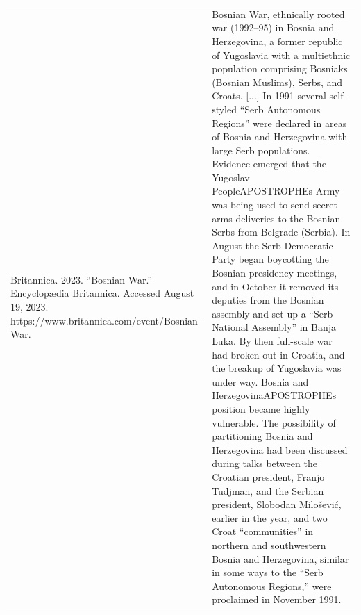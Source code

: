 {\begin{longtable}{p{}p{}}
Britannica. 2023. “Bosnian War.” Encyclopædia Britannica. Accessed August 19, 2023. https://www.britannica.com/event/Bosnian-War. & Bosnian War, ethnically rooted war (1992–95) in Bosnia and Herzegovina, a former republic of Yugoslavia with a multiethnic population comprising Bosniaks (Bosnian Muslims), Serbs, and Croats. [...] In 1991 several self-styled “Serb Autonomous Regions” were declared in areas of Bosnia and Herzegovina with large Serb populations. Evidence emerged that the Yugoslav PeopleAPOSTROPHEs Army was being used to send secret arms deliveries to the Bosnian Serbs from Belgrade (Serbia). In August the Serb Democratic Party began boycotting the Bosnian presidency meetings, and in October it removed its deputies from the Bosnian assembly and set up a “Serb National Assembly” in Banja Luka. By then full-scale war had broken out in Croatia, and the breakup of Yugoslavia was under way. Bosnia and HerzegovinaAPOSTROPHEs position became highly vulnerable. The possibility of partitioning Bosnia and Herzegovina had been discussed during talks between the Croatian president, Franjo Tudjman, and the Serbian president, Slobodan Milošević, earlier in the year, and two Croat “communities” in northern and southwestern Bosnia and Herzegovina, similar in some ways to the “Serb Autonomous Regions,” were proclaimed in November 1991.
\\

\end{longtable}}
